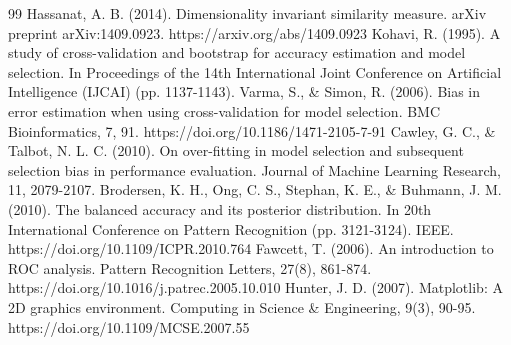 \documentclass[11pt,a4paper]{article}
\begin{document}
\begin{thebibliography}{99}
 Hassanat, A. B. (2014). Dimensionality invariant similarity measure. arXiv preprint arXiv:1409.0923. https://arxiv.org/abs/1409.0923
 Kohavi, R. (1995). A study of cross-validation and bootstrap for accuracy estimation and model selection. In Proceedings of the 14th International Joint Conference on Artificial Intelligence (IJCAI) (pp. 1137-1143).
 Varma, S., \& Simon, R. (2006). Bias in error estimation when using cross-validation for model selection. BMC Bioinformatics, 7, 91. https://doi.org/10.1186/1471-2105-7-91
 Cawley, G. C., \& Talbot, N. L. C. (2010). On over-fitting in model selection and subsequent selection bias in performance evaluation. Journal of Machine Learning Research, 11, 2079-2107.
 Brodersen, K. H., Ong, C. S., Stephan, K. E., \& Buhmann, J. M. (2010). The balanced accuracy and its posterior distribution. In 20th International Conference on Pattern Recognition (pp. 3121-3124). IEEE. https://doi.org/10.1109/ICPR.2010.764
 Fawcett, T. (2006). An introduction to ROC analysis. Pattern Recognition Letters, 27(8), 861-874. https://doi.org/10.1016/j.patrec.2005.10.010
 Hunter, J. D. (2007). Matplotlib: A 2D graphics environment. Computing in Science \& Engineering, 9(3), 90-95. https://doi.org/10.1109/MCSE.2007.55
\end{thebibliography}
\end{document}
